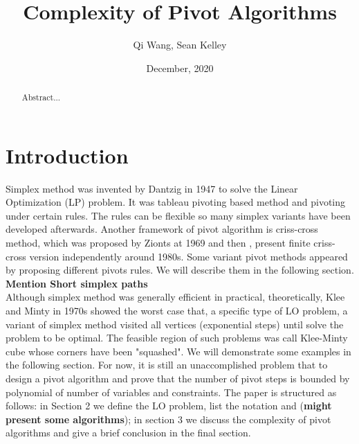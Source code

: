 \documentclass[11pt]{article}
\begin{document}
\newtheorem{theorem}{Theorem}
\newtheorem{corollary}{Corollary}
\newtheorem{lemma}{Lemma}
\newtheorem{definition}{Definition}
\DeclarePairedDelimiter{\norm}{\lVert}{\rVert} 

\title{Complexity of Pivot Algorithms}
\author{Qi Wang, Sean Kelley}
\date{December, 2020}
\maketitle


\begin{abstract}
Abstract...
\end{abstract}


\section{Introduction}
Simplex method was invented by Dantzig in 1947 \cite{dantzig1951maximization} to solve the Linear Optimization (LP) problem. It was tableau pivoting based method and pivoting under certain rules. The rules can be flexible so many simplex variants have been developed afterwards. Another framework of pivot algorithm is criss-cross method, which was proposed by Zionts at 1969 \cite{fukuda1997criss} and then \cite{terlaky1987finite}, \cite{chang1979least} present finite criss-cross version independently around 1980s. Some variant pivot methods appeared by proposing different pivots rules. We will describe them in the following section. \textbf{Mention Short simplex paths}\\
Although simplex method was generally efficient in practical, theoretically, Klee and Minty \cite{wikipediacontributors_2020_kleeminty} in 1970s showed the worst case that, a specific type of LO problem, a variant of simplex method visited all vertices (exponential steps) until solve the problem to be optimal. The feasible region of such problems was call Klee-Minty cube whose corners have been "squashed". We will demonstrate some examples in the following section. For now, it is still an unaccomplished problem that to design a pivot algorithm and prove that the number of pivot steps is bounded by polynomial of number of variables and constraints.
The paper is structured as follows: in Section 2 we define the LO problem, list the notation and (\textbf{might present some algorithms}); in section 3 we discuss the complexity of pivot algorithms and give a brief conclusion in the final section.
\end{document}
